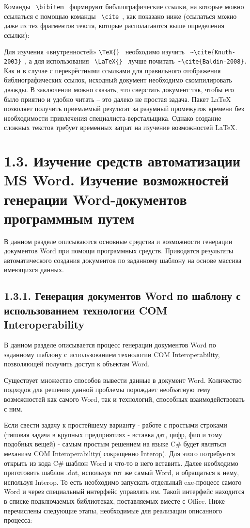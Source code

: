 Команды \verb| \bibitem | формируют библиографические ссылки, на которые можно ссылаться с помощью команды \verb| \cite |, как показано ниже (ссылаться можно даже из тех фрагментов текста, которые располагаются выше определения ссылки):

Для изучения «внутренностей» \verb|\TeX{} | необходимо изучить \verb| ~\cite{Knuth-2003} |, а для использования \verb| \LaTeX{} | лучше почитать\verb| ~\cite{Baldin-2008}.|
Как и в случае с перекрёстными ссылками для правильного отображения библиографических ссылок, исходный документ необходимо скомпилировать дважды.
В заключении можно сказать, что сверстать документ так, чтобы его было приятно и удобно читать – это далеко не простая задача. Пакет LaTeX позволяет получить приемлемый результат за разумный промежуток времени без необходимости привлечения специалиста-верстальщика. Однако создание сложных текстов требует временных затрат на изучение возможностей LaTeX. 




\section{1.3. Изучение средств автоматизации MS Word. Изучение возможностей генерации Word-документов программным путем}


В данном разделе описываются основные средства и возможности генерации документов Word при помощи программных средств. Приводятся результаты автоматического создания документов по заданному шаблону  на основе массива имеющихся данных.


\subsection{1.3.1. Генерация документов Word по шаблону с использованием технологии COM Interoperability}


В данном разделе описывается процесс генерации документов Word по заданному шаблону с использованием технологии COM Interoperability, позволяющей получить доступ к объектам Word.


Существует множество способов вывести данные в документ Word. Количество подходов для решения данной проблемы порождает необъятную тему возможностей как самого Word, так и технологий, способных взаимодействовать с ним. 

    Если свести задачу к простейшему варианту - работе с простыми строками (типовая задача в крупных предприятиях - вставка дат, цифр, фио и тому подобных вещей) - самым простым решением на языке C# будет являться механизм COM  Interoperability( сокращенно Interop). Для этого потребуется открыть из кода C# шаблон Word и что-то в него вставить. Далее необходимо приготовить шаблон .dot, используя тот же самый Word, и обращаться к нему, используя Interop. То есть необходимо запускать отдельный exe-процесс самого Word и через специальный интерфейс управлять им. Такой интерфейс находится в списке подключаемых библиотеках, поставляемых вместе с Office. Ниже перечислены следующие этапы, необходимые для реализации описанного процесса:

